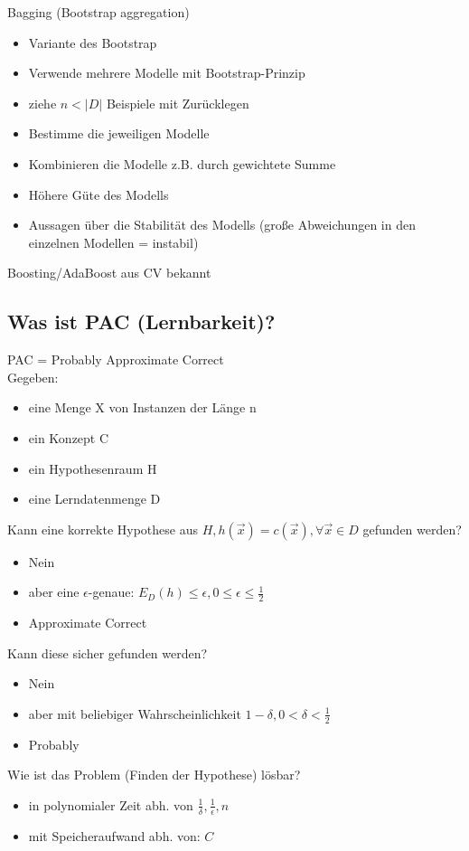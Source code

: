 \documentclass[paper=a4, fontsize=11pt]{scrartcl} %
\numberwithin{equation}{section} %
\numberwithin{figure}{section} %
\numberwithin{table}{section} %
\begin{document}
Bagging (Bootstrap aggregation)
\begin{itemize}
\item Variante des Bootstrap
\item Verwende mehrere Modelle mit Bootstrap-Prinzip
\item ziehe $n < |D|$ Beispiele mit Zurücklegen
\item Bestimme die jeweiligen Modelle
\item Kombinieren die Modelle z.B. durch gewichtete Summe
\item Höhere Güte des Modells
\item Aussagen über die Stabilität des Modells (große Abweichungen in den einzelnen Modellen = instabil)
\end{itemize}

Boosting/AdaBoost aus CV bekannt

\subsection{Was ist PAC (Lernbarkeit)?}

PAC = Probably Approximate Correct\\ 
Gegeben: 
\begin{itemize}
\item eine Menge X von Instanzen der Länge n
\item ein Konzept C
\item ein Hypothesenraum H
\item eine Lerndatenmenge D
\end{itemize}

Kann eine korrekte Hypothese aus $H, h(\vec{x}) = c(\vec{x}), \forall \vec{x} \in D$ gefunden werden?
\begin{itemize}
\item Nein
\item aber eine $\epsilon$-genaue: $E_D(h) \le \epsilon, 0 \le \epsilon \le \frac{1}{2}$
\item Approximate Correct
\end{itemize}

Kann diese sicher gefunden werden?
\begin{itemize}
\item Nein
\item aber mit beliebiger Wahrscheinlichkeit $1-\delta, 0<\delta<\frac{1}{2}$
\item Probably
\end{itemize}

Wie ist das Problem (Finden der Hypothese) lösbar?
\begin{itemize}
\item in polynomialer Zeit abh. von $\frac{1}{\delta}, \frac{1}{\epsilon},n$
\item mit Speicheraufwand abh. von: $C$
\end{itemize}
\end{document}
